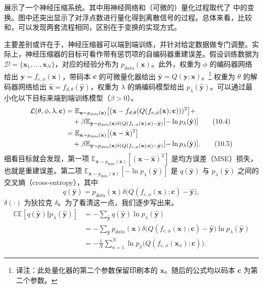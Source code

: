  展示了一个神经压缩系统。其中用神经网络和（可微的）量化过程取代了 中的变换。图中还突出显示了对浮点数进行量化得到离散信号的过程。总体来看，比较 和，可以发现两套流程相同，区别在于变换的实现方式。

主要差别或许在于，神经压缩器可以端到端训练，并针对给定数据做专门调整。实际上，神经压缩器的目标可看作带有惩罚项的自编码器重建误差。假设训练数据为 $\mathcal D=\{\mathbf x_1,\ldots,\mathbf x_N\}$，对应的经验分布为 $p_{\mathit{data}}(\mathbf x)$。此外，权重为 $\phi$ 的编码器网络给出 $\mathbf y=f_{e,\phi}(\mathbf x)$，带码本 $\mathbf c$ 的可微量化器给出 $\hat{\mathbf y}=Q(\mathbf y;\mathbf x)$。\footnote{译注：此处量化器的第二个参数保留印刷本的 $\mathbf x$。随后的公式均以码本 $\mathbf c$ 为第二个参数。} 权重为 $\theta$ 的解码器网络给出 $\hat{\mathbf x}=f_{d,\theta}(\hat{\mathbf y})$，权重为 $\lambda$ 的熵编码模型给出 $p_\lambda(\hat{\mathbf y})$。可以通过最小化以下目标来端到端训练模型（$\beta>0$）。
\begin{align}
  \mathcal L(\theta,\phi,\lambda,\mathbf c)
    &=\mathbb E_{\mathbf x\sim p_{\mathit{data}}(\mathbf x)}
    \bigl[(\mathbf x-f_{d,\theta}(Q(f_{e,\phi}(\mathbf x);\mathbf c)))^2\bigr]+
    \notag\\
    &\quad+\beta\mathbb E_{\hat{\mathbf y}\sim p_{\mathit{data}}(\mathbf x)
      \delta(Q(f_{e,\phi}(\mathbf x);\mathbf c)-\hat{\mathbf y})}
      [-\ln p_\lambda(\hat{\mathbf y})]
      \tag{10.4}\label{eq:10-04}\\
    &=\mathbb E_{\mathbf x\sim p_{\mathit{data}}(\mathbf x)}
      \bigl[(\mathbf x-\hat{\mathbf x})^2\bigr]\notag\\
    &\quad+\beta\mathbb E_{\hat{\mathbf y}\sim p_{\mathit{data}}(\mathbf x)
      \delta(Q(f_{e,\phi}(\mathbf x);\mathbf c)-\hat{\mathbf y})}
      [-\ln p_\lambda(\hat{\mathbf y})].
      \tag{10.5}\label{eq:10-05}
\end{align}
细看目标就会发现，第一项 $\mathbb E_{\mathbf x\sim p_{\mathit{data}}(\mathbf x)}[(\mathbf x-\hat{\mathbf x})^2]$ 是均方误差（MSE）损失，也就是重建误差。第二项 $\mathbb E_{\mathbf x\sim p_{\mathit{data}}(\mathbf x)}[-\ln p_\lambda(\hat{\mathbf y})]$ 是 $q(\hat{\mathbf y})$ 与 $p_\lambda(\hat{\mathbf y})$ 之间的交叉熵（cross-entropy），其中
\[
  q(\hat{\mathbf y})=p_{\mathit{data}}(\mathbf x)\delta\bigl(Q(f_{e,\phi}(\mathbf x);\mathbf c)-\hat{\mathbf y}\bigr),
\]
$\delta(\cdot)$ 为狄拉克 $\delta$。为了看清这一点，我们逐步写出来。
\begin{align}
  \mathbb{CE}[q(\hat{\mathbf y})\Vert p_\lambda(\hat{\mathbf y})]
    &=-\sum_{\hat{\mathbf y}}q(\hat{\mathbf y})\ln p_\lambda(\hat{\mathbf y})
      \tag{10.6}\label{eq:10-06}\\
    &=-\sum_{\hat{\mathbf y}}p_{\mathit{data}}(\mathbf x)
      \delta\bigl(Q(f_{e,\phi}(\mathbf x);\mathbf c)-\hat{\mathbf y}\bigr)\ln p_\lambda(\hat{\mathbf y})
      \tag{10.7}\label{eq:10-07}\\
    &=-\frac1N\sum_{n=1}^N
      \ln p_\lambda\bigl(Q(f_{e,\phi}(\mathbf x_n);\mathbf c)\bigr).
      \tag{10.8}\label{eq:10-08}
\end{align}
